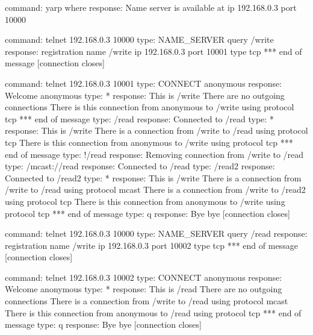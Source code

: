 \documentclass[a4]{article}
\begin{document}
\begin{code}
command:  yarp where
response: Name server is available at ip 192.168.0.3 port 10000

command:  telnet 192.168.0.3 10000
type:     NAME_SERVER query /write
response: registration name /write ip 192.168.0.3 port 10001 type tcp
          *** end of message
          [connection closes]

command:  telnet 192.168.0.3 10001
type:     CONNECT anonymous
response: Welcome anonymous
type:     *
response: This is /write
          There are no outgoing connections
          There is this connection from anonymous to /write using protocol tcp
          *** end of message
type:     /read
response: Connected to /read
type:     *
response: This is /write
          There is a connection from /write to /read using protocol tcp
          There is this connection from anonymous to /write using protocol tcp
          *** end of message
type:     !/read
response: Removing connection from /write to /read
type:     /mcast://read
response: Connected to /read
type:     /read2
response: Connected to /read2
type:     *
response: This is /write
          There is a connection from /write to /read using protocol mcast
          There is a connection from /write to /read2 using protocol tcp
          There is this connection from anonymous to /write using protocol tcp
          *** end of message
type:     q
response: Bye bye
          [connection closes]

command:  telnet 192.168.0.3 10000
type:     NAME_SERVER query /read
response: registration name /write ip 192.168.0.3 port 10002 type tcp
          *** end of message
          [connection closes]

command:  telnet 192.168.0.3 10002
type:     CONNECT anonymous
response: Welcome anonymous
type:     *
response: This is /read
          There are no outgoing connections
          There is a connection from /write to /read using protocol mcast
          There is this connection from anonymous to /read using protocol tcp
          *** end of message
type:     q
response: Bye bye
          [connection closes]

\end{code}
\end{document}
